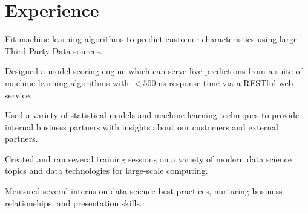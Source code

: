 \documentclass[letterpaper]{deedy-resume} %
\begin{document}
\hfill
%
%
\begin{minipage}[t]{0.63\textwidth} %


\section{Experience}
\vspace{\topsep}
\begin{tightitemize}
\item Fit machine learning algorithms to predict customer characteristics using
  large Third Party Data sources.
\item Designed a model scoring engine which 
  can serve live predictions from a suite of machine learning algorithms with
  $<500$ms response time via a RESTful web service.
\item Used a variety of statistical models and machine learning techniques to
  provide internal business partners with insights about our customers and
  external partners.
\item Created and ran several training sessions on a variety of modern data
  science topics and data technologies for large-scale computing.
\item Mentored several interns on data science best-practices, nurturing
  business relationships, and presentation skills.
\end{tightitemize}
\sectionspace


\end{minipage}
\end{document}
